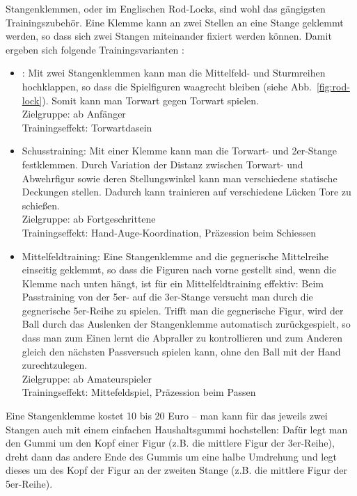 Stangenklemmen, oder im Englischen Rod-Locks, sind wohl das gängigsten Trainingszubehör. 
Eine Klemme kann an zwei Stellen an eine Stange geklemmt werden, so dass sich zwei Stangen miteinander fixiert werden können. 
Damit ergeben sich folgende Trainingsvarianten \citep{www:rod-lock}:
\begin{itemize}
    \item {}: Mit zwei Stangenklemmen kann man die Mittelfeld- und Sturmreihen hochklappen, so dass die Spielfiguren waagrecht bleiben (siehe Abb.~\ref{fig:rod-lock}). 
        Somit kann man Torwart gegen Torwart spielen. 
        \\
        Zielgruppe: ab Anfänger
        \\
        Trainingseffekt: Torwartdasein
    \item Schusstraining: Mit einer Klemme kann man die Torwart- und 2er-Stange festklemmen. 
        Durch Variation der Distanz zwischen Torwart- und Abwehrfigur sowie deren Stellungswinkel kann man verschiedene statische Deckungen stellen.
        Dadurch kann trainieren auf verschiedene Lücken Tore zu schießen.  
        \\
        Zielgruppe: ab Fortgeschrittene
        \\
        Trainingseffekt: Hand-Auge-Koordination, Präzession beim Schiessen
    \item Mittelfeldtraining: Eine Stangenklemme and die gegnerische Mittelreihe einseitig geklemmt, so dass die Figuren nach vorne gestellt sind, wenn die Klemme nach unten hängt, ist für ein Mittelfeldtraining effektiv:
        Beim Passtraining von der 5er- auf die 3er-Stange versucht man durch die gegnerische 5er-Reihe zu spielen. 
        Trifft man die gegnerische Figur, wird der Ball durch das Auslenken der Stangenklemme automatisch zurückgespielt, so dass man zum Einen lernt die Abpraller zu kontrollieren und zum Anderen gleich den nächsten Passversuch spielen kann, ohne den Ball mit der Hand zurechtzulegen.
        \\
        Zielgruppe: ab Amateurspieler
        \\
        Trainingseffekt: Mittefeldspiel, Präzession beim Passen
\end{itemize}
Eine Stangenklemme kostet 10 bis 20 Euro -- man kann für das  jeweils zwei Stangen auch mit einem einfachen Haushaltsgummi hochstellen:
Dafür legt man den Gummi um den Kopf einer Figur (z.B. die mittlere Figur der 3er-Reihe), dreht dann das andere Ende des Gummis um eine halbe Umdrehung und legt dieses um des Kopf der Figur an der zweiten Stange (z.B. die mittlere Figur der 5er-Reihe). 

